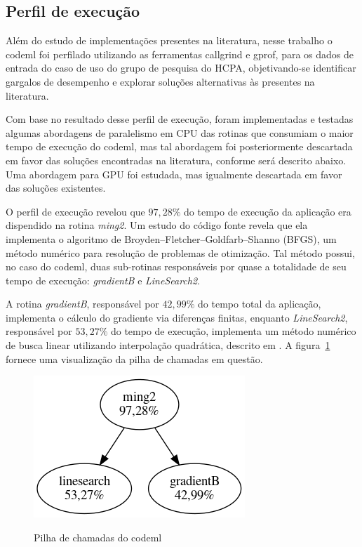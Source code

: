\documentclass[cic,tc]{iiufrgs}
\begin{document}
{\subsection{Perfil de execução}
\label{subsec:codemlpar}

Além do estudo de implementações presentes na literatura, nesse trabalho o
codeml foi perfilado utilizando as ferramentas callgrind e gprof, para os dados
de entrada do caso de uso do grupo de pesquisa do HCPA, objetivando-se
identificar gargalos de desempenho e explorar soluções alternativas às
presentes na literatura.

Com base no resultado desse perfil de execução, foram implementadas e testadas
algumas abordagens de paralelismo em CPU das rotinas que consumiam o maior
tempo de execução do codeml, mas tal abordagem foi posteriormente descartada em
favor das soluções encontradas na literatura, conforme será descrito abaixo.
Uma abordagem para GPU foi estudada, mas igualmente descartada em favor das
soluções existentes.

O perfil de execução revelou que $97,28\%$ do tempo de execução da aplicação
era dispendido na rotina \textit{ming2}. Um estudo do código fonte revela que
ela implementa o algoritmo de Broyden–Fletcher–Goldfarb–Shanno (BFGS), um
método numérico para resolução de problemas de otimização. Tal método possui,
no caso do codeml, duas sub-rotinas responsáveis por quase a totalidade de seu
tempo de execução: \textit{gradientB} e \textit{LineSearch2}.

A rotina \textit{gradientB}, responsável por $42,99\%$ do tempo total da
aplicação, implementa o cálculo do gradiente via diferenças finitas, enquanto
\textit{LineSearch2}, responsável por $53,27\%$ do tempo de execução,
implementa um método numérico de busca linear utilizando interpolação
quadrática, descrito em \cite{wolfe1978numerical}. A
figura~\ref{fig:kcachegrind} fornece uma visualização da pilha de chamadas em
questão.

\begin{figure} \caption{Pilha de chamadas do codeml} \begin{center}
\includegraphics[width=0.3\linewidth]{img/kcachegrind.png} \end{center}
 \label{fig:kcachegrind} \end{figure}

}
\end{document}

